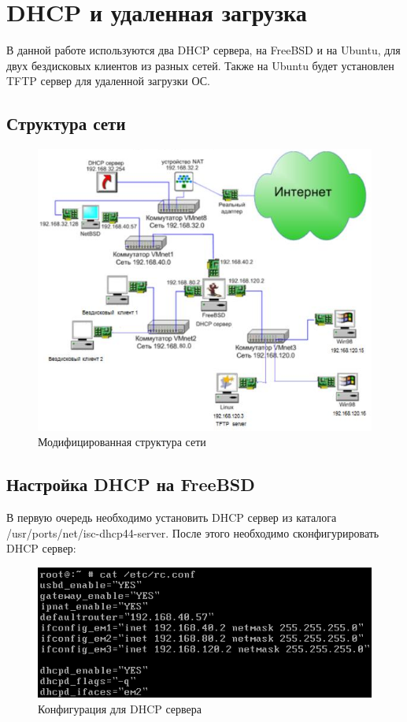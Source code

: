 \documentclass[14pt,a4paper,report]{report}
\begin{document}
\section{DHCP и удаленная загрузка}

В данной работе используются два DHCP сервера, на FreeBSD и на Ubuntu, для двух бездисковых клиентов из разных сетей. Также на Ubuntu будет установлен TFTP сервер для удаленной загрузки ОС.

\subsection{Структура сети}

\begin{figure}[h!]
	\centering
	\includegraphics[scale = 0.95]{images/0_0.png}
	\caption{Модифицированная структура сети}
	\label{image:0}
\end{figure}

\clearpage

\subsection{Настройка DHCP на FreeBSD}

В первую очередь необходимо установить DHCP сервер из каталога /usr/ports/net/isc-dhcp44-server. После этого необходимо сконфигурировать DHCP сервер:

\begin{figure}[h!]
	\centering
	\includegraphics[scale = 1.1]{images/1_0.png}
	\caption{Конфигурация для DHCP сервера}
	\label{image:2}
\end{figure}
\end{document}
